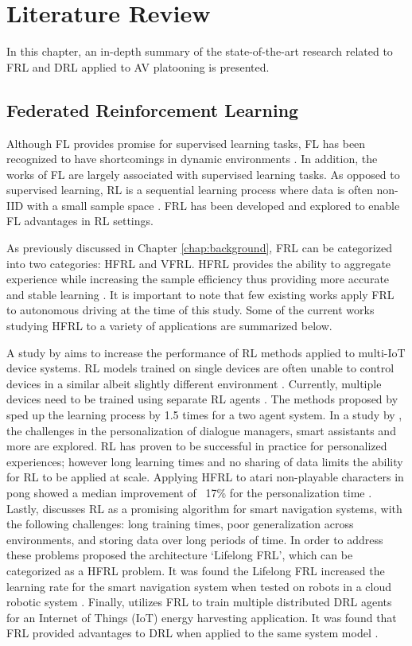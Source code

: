 \chapter{Literature Review} \label{chap:litreview}
In this chapter, an in-depth summary of the state-of-the-art research related to
FRL and DRL applied to AV platooning is presented.

\section{Federated Reinforcement Learning}
Although FL provides promise for supervised learning tasks, FL has been recognized to have
shortcomings in dynamic environments \cite{Li2020a}.   In addition, the works of FL
are largely associated with supervised learning tasks. As opposed to supervised learning,
RL is a sequential learning process where data is often non-IID with a small sample space
\cite{Zhuo2019, sutton2018reinforcement}. FRL has been developed and explored to enable FL advantages
in RL settings.

As previously discussed in Chapter \ref{chap:background}, FRL can be categorized into two categories: HFRL and VFRL.
HFRL provides the ability to aggregate experience while increasing the sample efficiency thus
providing more accurate and stable learning  \cite{IntelAI19}.
It is important to note that few existing works apply
FRL to autonomous driving at the time of this study.  Some of the current works studying
HFRL to a variety of applications are summarized below.

A study by \cite{Lim2020} aims to increase the performance of RL methods applied to
multi-IoT device systems.  RL models trained on single devices are often unable to control
devices in a similar albeit slightly different environment \cite{Lim2020}.  Currently,
multiple devices need to be trained using separate RL agents \cite{Lim2020}. The methods
proposed by \cite{Lim2020} sped up the learning process by 1.5 times for a two agent system.
In a study by \cite{Nadiger2019}, the challenges in the personalization of dialogue
managers, smart assistants and more are explored.  RL has proven to be successful in
practice for personalized experiences; however long learning times and no sharing of data
limits the ability for RL to be applied at scale.  Applying HFRL to atari non-playable
characters in pong showed a median improvement of ~17\% for the personalization time
\cite{Nadiger2019}. Lastly, \cite{Liu2019b} discusses RL as a promising algorithm for
smart navigation systems, with the following challenges: long training times, poor
generalization across environments, and storing data over long periods of time.  In order
to address these problems \cite{Liu2019b} proposed the architecture `Lifelong FRL',
which can be categorized as a HFRL problem.  It was found the Lifelong FRL increased
the learning rate for the smart navigation system when tested on robots in a cloud
robotic system \cite{Liu2019b}. Finally, \cite{Ren2019} utilizes FRL to train multiple distributed
DRL agents for an Internet of Things (IoT) energy harvesting application.  It was found that FRL
provided advantages to DRL when applied to the same system model \cite{Ren2019}.


